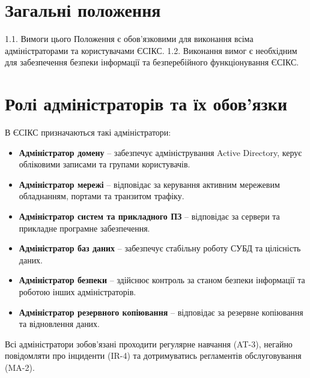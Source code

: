\documentclass[12pt]{article}
\begin{document}
\section{Загальні положення}
1.1. Вимоги цього Положення є обов'язковими для виконання всіма адміністраторами та користувачами ЄСІКС.
1.2. Виконання вимог є необхідним для забезпечення безпеки інформації та безперебійного функціонування ЄСІКС.

\section{Ролі адміністраторів та їх обов'язки}
В ЄСІКС призначаються такі адміністратори:
\begin{itemize}
  \item \textbf{Адміністратор домену} -- забезпечує адміністрування Active Directory, керує обліковими записами та групами користувачів.
  \item \textbf{Адміністратор мережі} -- відповідає за керування активним мережевим обладнанням, портами та транзитом трафіку.
  \item \textbf{Адміністратор систем та прикладного ПЗ} -- відповідає за сервери та прикладне програмне забезпечення.
  \item \textbf{Адміністратор баз даних} -- забезпечує стабільну роботу СУБД та цілісність даних.
  \item \textbf{Адміністратор безпеки} -- здійснює контроль за станом безпеки інформації та роботою інших адміністраторів.
  \item \textbf{Адміністратор резервного копіювання} -- відповідає за резервне копіювання та відновлення даних.
\end{itemize}

Всі адміністратори зобов'язані проходити регулярне навчання (AT-3), негайно повідомляти про інциденти (IR-4) та дотримуватись регламентів обслуговування (MA-2).
\end{document}

